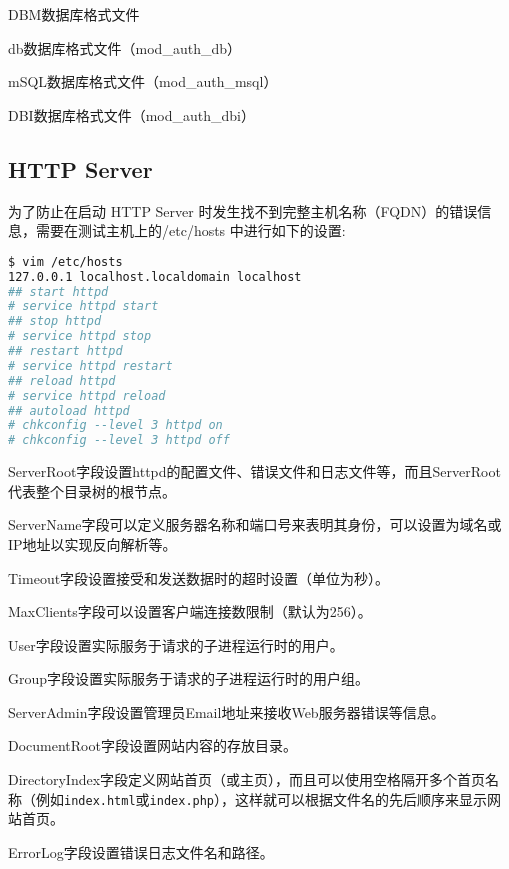 \begin{compactitem}
\item DBM数据库格式文件
\item db数据库格式文件（mod\_auth\_db）
\item mSQL数据库格式文件（mod\_auth\_msql）
\item DBI数据库格式文件（mod\_auth\_dbi）
\end{compactitem}




\subsection{HTTP Server}

为了防止在启动 HTTP Server 时发生找不到完整主机名称（FQDN）的错误信息，需要在测试主机上的/etc/hosts 中进行如下的设置:




\begin{lstlisting}[language=bash]
$ vim /etc/hosts
127.0.0.1 localhost.localdomain localhost
## start httpd
# service httpd start
## stop httpd
# service httpd stop
## restart httpd
# service httpd restart
## reload httpd
# service httpd reload
## autoload httpd
# chkconfig --level 3 httpd on
# chkconfig --level 3 httpd off
\end{lstlisting}



\begin{compactitem}
\item ServerRoot字段设置httpd的配置文件、错误文件和日志文件等，而且ServerRoot代表整个目录树的根节点。
\item ServerName字段可以定义服务器名称和端口号来表明其身份，可以设置为域名或IP地址以实现反向解析等。
\item Timeout字段设置接受和发送数据时的超时设置（单位为秒）。
\item MaxClients字段可以设置客户端连接数限制（默认为256）。
\item User字段设置实际服务于请求的子进程运行时的用户。
\item Group字段设置实际服务于请求的子进程运行时的用户组。
\item ServerAdmin字段设置管理员Email地址来接收Web服务器错误等信息。
\item DocumentRoot字段设置网站内容的存放目录。
\item DirectoryIndex字段定义网站首页（或主页），而且可以使用空格隔开多个首页名称（例如\texttt{index.html}或\texttt{index.php}），这样就可以根据文件名的先后顺序来显示网站首页。
\item ErrorLog字段设置错误日志文件名和路径。
\end{compactitem}

